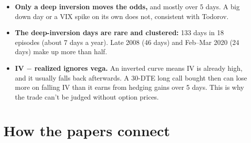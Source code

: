\documentclass{article}
\begin{document}
\begin{itemize}

\item \textbf{Only a deep inversion moves the odds,} and mostly over 5 days. A big down day or a VIX spike on its own does not, consistent with Todorov.

\item \textbf{The deep-inversion days are rare and clustered:} 133 days in 18 episodes (about 7 days a year). Late 2008 (46 days) and Feb--Mar 2020 (24 days) make up more than half.

\item \textbf{IV \ensuremath{-} realized ignores vega.} An inverted curve means IV is already high, and it usually falls back afterwards. A 30-DTE long call bought then can lose more on falling IV than it earns from hedging gains over 5 days. This is why the trade can't be judged without option prices.

\end{itemize}

\section{How the papers connect}
\end{document}
